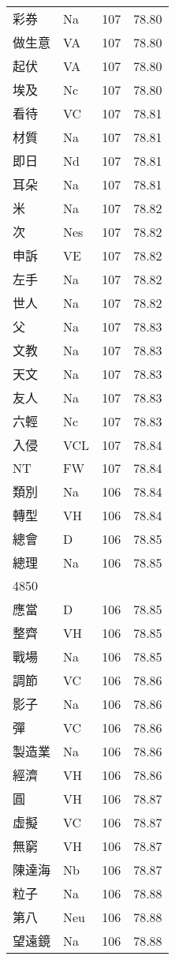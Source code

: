\documentclass[twocolumn]{book}
\begin{document}
\begin{supertabular}{llrr}
彩券 & Na & 107 &  78.80\\
做生意 & VA & 107 &  78.80\\
起伏 & VA & 107 &  78.80\\
埃及 & Nc & 107 &  78.80\\
看待 & VC & 107 &  78.81\\
材質 & Na & 107 &  78.81\\
即日 & Nd & 107 &  78.81\\
耳朵 & Na & 107 &  78.81\\
米 & Na & 107 &  78.82\\
次 & Nes & 107 &  78.82\\
申訴 & VE & 107 &  78.82\\
左手 & Na & 107 &  78.82\\
世人 & Na & 107 &  78.82\\
父 & Na & 107 &  78.83\\
文教 & Na & 107 &  78.83\\
天文 & Na & 107 &  78.83\\
友人 & Na & 107 &  78.83\\
六輕 & Nc & 107 &  78.83\\
入侵 & VCL & 107 &  78.84\\
NT & FW & 107 &  78.84\\
類別 & Na & 106 &  78.84\\
轉型 & VH & 106 &  78.84\\
總會 & D & 106 &  78.85\\
總理 & Na & 106 &  78.85\\
4850\\
應當 & D & 106 &  78.85\\
整齊 & VH & 106 &  78.85\\
戰場 & Na & 106 &  78.85\\
調節 & VC & 106 &  78.86\\
影子 & Na & 106 &  78.86\\
彈 & VC & 106 &  78.86\\
製造業 & Na & 106 &  78.86\\
經濟 & VH & 106 &  78.86\\
圓 & VH & 106 &  78.87\\
虛擬 & VC & 106 &  78.87\\
無窮 & VH & 106 &  78.87\\
陳達海 & Nb & 106 &  78.87\\
粒子 & Na & 106 &  78.88\\
第八 & Neu & 106 &  78.88\\
望遠鏡 & Na & 106 &  78.88\\

\end{supertabular}
\end{document}
